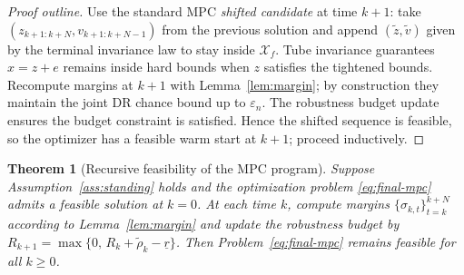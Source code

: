 \documentclass[journal]{IEEEtran}
\newtheorem{theorem}{Theorem}
\theoremstyle{definition}
\begin{document}
\begin{proof}[Proof outline]
Use the standard MPC \emph{shifted candidate} at time $k{+}1$: take $(z_{k+1:k+N},v_{k+1:k+N-1})$ from the previous solution and append $(\tilde z,\tilde v)$ given by the terminal invariance law to stay inside $\mathcal{X}_f$. Tube invariance guarantees $x=z+e$ remains inside hard bounds when $z$ satisfies the tightened bounds. Recompute margins at $k{+}1$ with Lemma~\ref{lem:margin}; by construction they maintain the joint DR chance bound up to $\varepsilon_n$. The robustness budget update ensures the budget constraint is satisfied. Hence the shifted sequence is feasible, so the optimizer has a feasible warm start at $k{+}1$; proceed inductively.
\end{proof}

\begin{theorem}[Recursive feasibility of the MPC program]
\label{thm:feas}
Suppose Assumption~\ref{ass:standing} holds and the optimization problem
\eqref{eq:final-mpc} admits a feasible solution at $k=0$.
At each time $k$, compute margins $\{\sigma_{k,t}\}_{t=k}^{k+N}$ according to
Lemma~\ref{lem:margin} and update the robustness budget by
$R_{k+1}=\max\{0,\,R_k+\widetilde\rho_k-\underline r\}$.
Then Problem~\eqref{eq:final-mpc} remains feasible for all $k\ge 0$.
\end{theorem}
\end{document}
